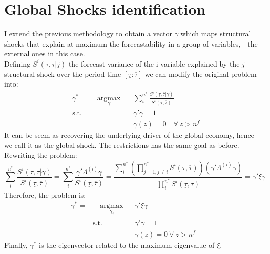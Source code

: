 \documentclass[12pt, a4paper]{article}
\begin{document}
\section{Global Shocks identification}
I extend the previous methodology to obtain a vector $\gamma$ which maps structural shocks that explain at maximum the forecastability in a group of variables, - the external ones in this case. \\
Defining $S^{i}(\underline{\tau},\overline{\tau}|j)$ the forecast variance of the i-variable explained by the $j$ structural shock over the period-time $[\underline{\tau}:\overline{\tau}]$ we can modify the original problem into:
\begin{equation*}
\begin{aligned}
& \gamma^* &= \underset{\gamma}{\text{argmax}}  \quad
&  \sum_i^{n^*}\frac{S^{i}(\underline{\tau},\overline{\tau}|\gamma)}{S^{i}(\underline{\tau},\overline{\tau})} \\
& \text{s.t.}
&  & \gamma' \gamma = 1 \\
&  & & \gamma(z)  = 0 \quad \forall \ z>n^f
\end{aligned}
\end{equation*}
It can be seem as recovering the underlying driver of the global economy, hence we call it as the global shock. The restrictions has the same goal as before.
Rewriting the problem:
\begin{equation*}
\sum_i^{n^*}\frac{S^{i}(\underline{\tau},\overline{\tau}|\gamma)}{S^{i}(\underline{\tau},\overline{\tau})}
 =  \sum_i^{n^*}\frac{\gamma' \Lambda^{(i)} \gamma}{S^{i}(\underline{\tau},\overline{\tau})}
 =   \frac{\sum_i^{n^*} \left( \prod_{j=1,j\neq i}^{n^*} S^{i}(\underline{\tau},\overline{\tau})\right) \left( \gamma' \Lambda^{(i)} \gamma \right)}{\prod_i^{n^*} S^{i}(\underline{\tau},\overline{\tau})}
= \gamma' \xi  \gamma
\end{equation*}
Therefore, the problem is:
\begin{equation*}
\begin{aligned}
\gamma^* =  & \quad \underset{\gamma_j}{\text{argmax}}
& & \gamma' \xi \gamma \\
& \text{s.t.}
& & \gamma' \gamma = 1\\
& & & \gamma(z) = 0 \ \forall \ z > n^f
\end{aligned}
\end{equation*}
Finally, $\gamma^*$ is the eigenvector related to the maximum eigenvalue of $\xi$.
\end{document}
